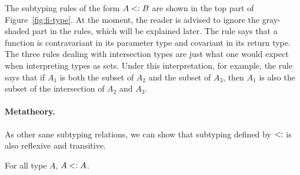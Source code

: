 


The subtyping rules of the form $A <: B$ are shown in the top part of
Figure~\ref{fig:fi-type}. At the moment, the reader is advised to ignore the
gray-shaded part in the rules, which will be explained later. The rule
 says that a function is contravariant in its parameter
type and covariant in its return type. The three rules dealing with
intersection types are just what one would expect when interpreting types as
sets. Under this interpretation, for example, the rule 
says that if $A_1$ is both the subset of $A_2$ and the subset of $A_3$, then
$A_1$ is also the subset of the intersection of $A_2$ and $A_3$.

\paragraph{Metatheory.} As other sane subtyping relations, we can show that
subtyping defined by $<:$ is also reflexive and transitive.

\begin{lemma} \label{lemma:sub-refl}
  For all type $ A $, $ A <: A $.
\end{lemma}

